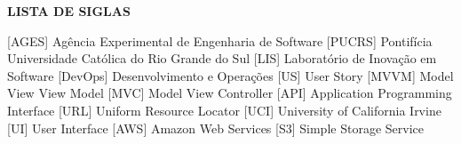 
\begin{center}
  \uppercase{\bfseries lista de siglas}\\[3em]
\end{center}

\begin{acronym}[XXXXXXXX]
   [AGES] {Agência Experimental de Engenharia de Software}
   [PUCRS] {Pontifícia Universidade Católica do Rio Grande do Sul}
   [LIS] {Laboratório de Inovação em Software}
   [DevOps] {Desenvolvimento e Operações}
   [US] {User Story}
   [MVVM] {Model View View Model}
   [MVC] {Model View Controller}
   [API] {Application Programming Interface}
   [URL] {Uniform Resource Locator}
   [UCI] {University of California Irvine}
   [UI] {User Interface}
   [AWS] {Amazon Web Services}{}
   [S3] {Simple Storage Service}
\end{acronym}